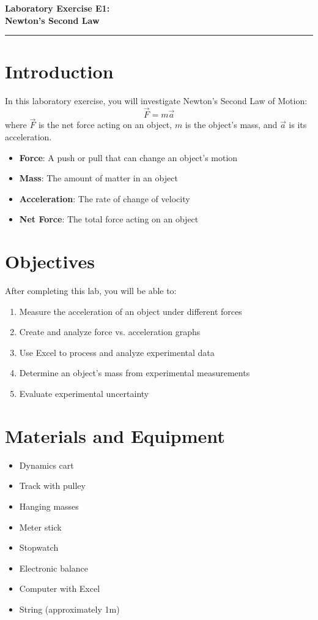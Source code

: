 \documentclass[12pt]{article}
\begin{document}
\begin{center}
{\Large \textbf{Laboratory Exercise E1:}}\\[0.5cm]
{\LARGE \textbf{Newton's Second Law}}\\[1cm]
\rule{\textwidth}{0.4pt}
\end{center}

\section*{Introduction}
In this laboratory exercise, you will investigate Newton's Second Law of Motion: $$\vec{F} = m\vec{a}$$
where $\vec{F}$ is the net force acting on an object, $m$ is the object's mass, and $\vec{a}$ is its acceleration.

\begin{tcolorbox}[colback=labblue!10,colframe=labblue,title=\textbf{Key Terms}]
\begin{itemize}
\item \textbf{Force}: A push or pull that can change an object's motion
\item \textbf{Mass}: The amount of matter in an object
\item \textbf{Acceleration}: The rate of change of velocity
\item \textbf{Net Force}: The total force acting on an object
\end{itemize}
\end{tcolorbox}

\section*{Objectives}
After completing this lab, you will be able to:
\begin{enumerate}[label=\arabic*.]
\item Measure the acceleration of an object under different forces
\item Create and analyze force vs. acceleration graphs
\item Use Excel to process and analyze experimental data
\item Determine an object's mass from experimental measurements
\item Evaluate experimental uncertainty
\end{enumerate}

\section*{Materials and Equipment}
\begin{itemize}
\item Dynamics cart
\item Track with pulley
\item Hanging masses 
\item Meter stick
\item Stopwatch
\item Electronic balance
\item Computer with Excel
\item String (approximately 1m)
\end{itemize}
\end{document}
